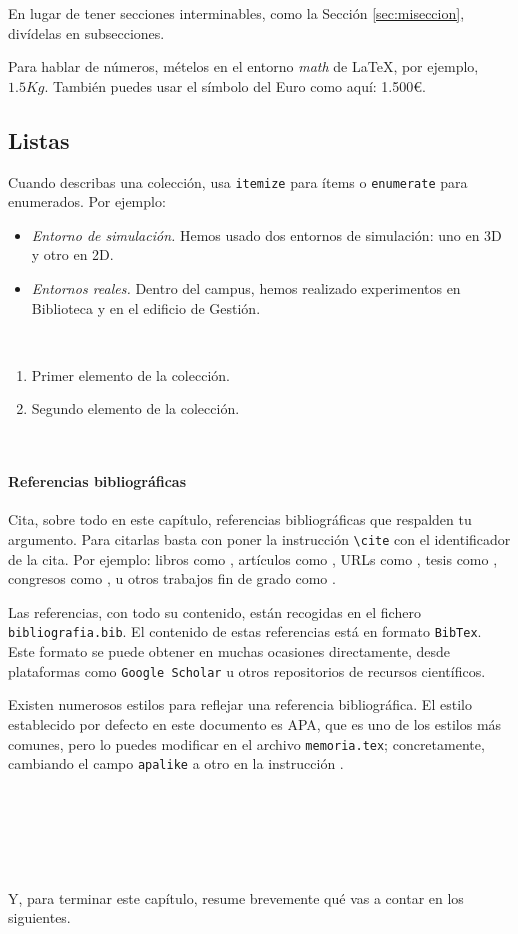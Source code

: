 En lugar de tener secciones interminables, como la Sección \ref{sec:miseccion}, divídelas en subsecciones.

Para hablar de números, mételos en el entorno \textit{math} de \LaTeX, por ejemplo, $1.5Kg$. También puedes usar el símbolo del Euro como aquí: 1.500\euro.

\subsection{Listas}

Cuando describas una colección, usa \texttt{itemize} para ítems o \texttt{enumerate} para enumerados. Por ejemplo:

\begin{itemize}
 \item \textit{Entorno de simulación.} Hemos usado dos entornos de simulación: uno en 3D y otro en 2D.
 \item \textit{Entornos reales.} Dentro del campus, hemos realizado experimentos en Biblioteca y en el edificio de Gestión.
\end{itemize}\

\begin{enumerate}
 \item Primer elemento de la colección.
 \item Segundo elemento de la colección.
\end{enumerate}\

\paragraph{Referencias bibliográficas}
\label{sec:referencias}

Cita, sobre todo en este capítulo, referencias bibliográficas que respalden tu argumento. Para citarlas basta con poner la instrucción \verb|\cite| con el identificador de la cita. Por ejemplo: libros como \cite{vega12e}, artículos como \cite{vega19b}, URLs como \cite{vega19a}, tesis como \cite{vega18b}, congresos como \cite{vega18a}, u otros trabajos fin de grado como \cite{vega08b}.

Las referencias, con todo su contenido, están recogidas en el fichero \texttt{bibliografia.bib}. El contenido de estas referencias está en formato \texttt{BibTex}. Este formato se puede obtener en muchas ocasiones directamente, desde plataformas como \texttt{Google Scholar} u otros repositorios de recursos científicos.

Existen numerosos estilos para reflejar una referencia bibliográfica. El estilo establecido por defecto en este documento es APA, que es uno de los estilos más comunes, pero lo puedes modificar en el archivo \texttt{memoria.tex}; concretamente, cambiando el campo \verb|apalike| a otro en la instrucción \verb||. 

\

\

\

Y, para terminar este capítulo, resume brevemente qué vas a contar en los siguientes.
